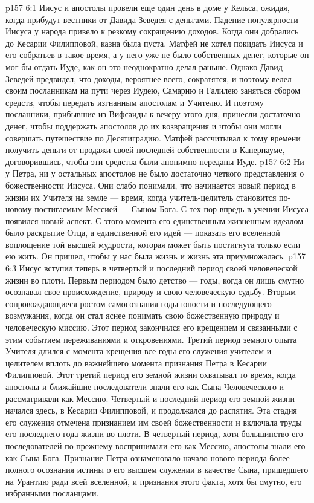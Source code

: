 \vs p157 6:1 Иисус и апостолы провели еще один день в доме у Кельса, ожидая, когда прибудут вестники от Давида Зеведея с деньгами. Падение популярности Иисуса у народа привело к резкому сокращению доходов. Когда они добрались до Кесарии Филипповой, казна была пуста. Матфей не хотел покидать Иисуса и его собратьев в такое время, а у него уже не было собственных денег, которые он мог бы отдать Иуде, как он это неоднократно делал раньше. Однако Давид Зеведей предвидел, что доходы, вероятнее всего, сократятся, и поэтому велел своим посланникам на пути через Иудею, Самарию и Галилею заняться сбором средств, чтобы передать изгнанным апостолам и Учителю. И поэтому посланники, прибывшие из Вифсаиды к вечеру этого дня, принесли достаточно денег, чтобы поддержать апостолов до их возвращения и чтобы они могли совершать путешествие по Десятиградию. Матфей рассчитывал к тому времени получить деньги от продажи своей последней собственности в Капернауме, договорившись, чтобы эти средства были анонимно переданы Иуде.
\vs p157 6:2 \pc Ни у Петра, ни у остальных апостолов не было достаточно четкого представления о божественности Иисуса. Они слабо понимали, что начинается новый период в жизни их Учителя на земле --- время, когда учитель\hyp{}целитель становится по\hyp{}новому постигаемым Мессией --- Сыном Бога. С тех пор впредь в учении Иисуса появился новый аспект. С этого момента его единственным жизненным идеалом было раскрытие Отца, а единственной его идей --- показать его вселенной воплощение той высшей мудрости, которая может быть постигнута только если ею жить. Он пришел, чтобы у нас была жизнь и жизнь эта приумножалась.
\vs p157 6:3 Иисус вступил теперь в четвертый и последний период своей человеческой жизни во плоти. Первым периодом было детство --- годы, когда он лишь смутно осознавал свое происхождение, природу и свою человеческую судьбу. Вторым --- сопровождающиеся ростом самосознания годы юности и последующего возмужания, когда он стал яснее понимать свою божественную природу и человеческую миссию. Этот период закончился его крещением и связанными с этим событием переживаниями и откровениями. Третий период земного опыта Учителя длился с момента крещения все годы его служения учителем и целителем вплоть до важнейшего момента признания Петра в Кесарии Филипповой. Этот третий период его земной жизни охватывал то время, когда апостолы и ближайшие последователи знали его как Сына Человеческого и рассматривали как Мессию. Четвертый и последний период его земной жизни начался здесь, в Кесарии Филипповой, и продолжался до распятия. Эта стадия его служения отмечена признанием им своей божественности и включала труды его последнего года жизни во плоти. В четвертый период, хотя большинство его последователей по\hyp{}прежнему воспринимали его как Мессию, апостолы знали его как Сына Бога. Признание Петра ознаменовало начало нового периода более полного осознания истины о его высшем служении в качестве Сына, пришедшего на Урантию ради всей вселенной, и признания этого факта, хотя бы смутно, его избранными посланцами.
